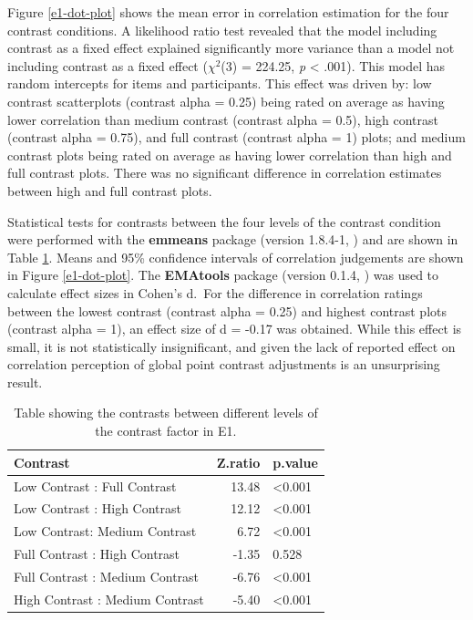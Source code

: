 \documentclass[preprint, 3p,
authoryear]{elsarticle} %
\begin{document}
Figure \ref{e1-dot-plot} shows the mean error in correlation estimation
for the four contrast conditions. A likelihood ratio test revealed that
the model including contrast as a fixed effect explained significantly
more variance than a model not including contrast as a fixed effect
(\(\chi^2\)(3) = 224.25, \emph{p} \textless{} .001). This model has
random intercepts for items and participants. This effect was driven by:
low contrast scatterplots (contrast alpha = 0.25) being rated on average
as having lower correlation than medium contrast (contrast alpha = 0.5),
high contrast (contrast alpha = 0.75), and full contrast (contrast alpha
= 1) plots; and medium contrast plots being rated on average as having
lower correlation than high and full contrast plots. There was no
significant difference in correlation estimates between high and full
contrast plots.

Statistical tests for contrasts between the four levels of the contrast
condition were performed with the \textbf{emmeans} package (version
1.8.4-1, \citealp{emmeans}) and are shown in Table
\ref{contrasts-table-e1}. Means and 95\% confidence intervals of
correlation judgements are shown in Figure \ref{e1-dot-plot}. The
\textbf{EMAtools} package (version 0.1.4, \citealp{ematools}) was used
to calculate effect sizes in Cohen's d.~For the difference in
correlation ratings between the lowest contrast (contrast alpha = 0.25)
and highest contrast plots (contrast alpha = 1), an effect size of d =
-0.17 was obtained. While this effect is small, it is not statistically
insignificant, and given the lack of reported effect on correlation
perception of global point contrast adjustments \citep{rensink_2012} is
an unsurprising result.

\begin{table}

\caption{\label{tab:contrasts-table-e1}\label{contrasts-table-e1}Table showing the contrasts between different levels of the contrast factor in E1.}
\centering
\begin{tabular}[t]{lrl}
\toprule
Contrast & Z.ratio & p.value\\
\midrule
Low Contrast : Full Contrast & 13.48 & <0.001\\
Low Contrast : High Contrast & 12.12 & <0.001\\
Low Contrast: Medium Contrast & 6.72 & <0.001\\
Full Contrast : High Contrast & -1.35 & 0.528\\
Full Contrast : Medium Contrast & -6.76 & <0.001\\
\addlinespace
High Contrast : Medium Contrast & -5.40 & <0.001\\
\bottomrule
\end{tabular}
\end{table}
\end{document}
